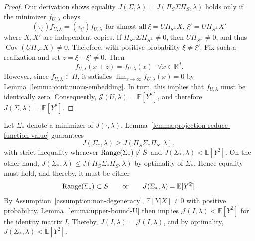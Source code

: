 \documentclass[sn-mathphys-num]{sn-jnl}%
\numberwithin{equation}{section}
\newcommand{\R}{\mathbb{R}}
\newcommand{\E}{\mathbb{E}}
\renewcommand{\P}{\mathbb{P}}
\newtheorem{assumption}{Assumption}[section]
\newcommand{\Range}{{\rm Range}}
\theoremstyle{thmstyleone}%
\theoremstyle{thmstyletwo}%
\theoremstyle{thmstylethree}%
\begin{document}
\begin{proof}
Our derivation shows equality 
$J(\Sigma, \lambda) = J(\Pi_{S} \Sigma \Pi_S, \lambda)$ holds
only if the minimizer $f_{U, \lambda}$ obeys 
\begin{equation*}
(\tau_{\xi}) f_{U, \lambda} = (\tau_{\xi'}) f_{U, \lambda}~~\text{for almost all}~\xi= U\Pi_{S^\perp} X, \, \xi' = U\Pi_{S^\perp}X'
\end{equation*}
where $X, X'$ are independent copies. If $\Pi_{S^\perp}\Sigma\Pi_{S^\perp}\neq 0$, then $U\Pi_{S^\perp}\neq 0$, and thus $\operatorname{Cov}(U\Pi_{S^\perp}X)\neq 0$. Therefore, with positive probability $\xi\neq \xi'$. Fix such a realization and set $z=\xi-\xi'\neq 0$. Then
\begin{equation*}
	f_{U, \lambda}(x + z)  = f_{U, \lambda}(x)~~~\forall x\in \R^d.
\end{equation*}
However, since $f_{U, \lambda} \in H$, it satisfies $\lim_{x \to \infty} f_{U, \lambda}(x) = 0$ 
by Lemma~\ref{lemma:continuous-embedding}. In turn, this implies that $f_{U, \lambda}$ must be identically zero. 
Consequently, $\mathcal{J}(U, \lambda) = \E[Y^2]$, and therefore $J(\Sigma, \lambda) = \E[Y^2]$.
\end{proof} 

%

\vspace{.5em} 

Let $\Sigma_*$ denote a 
minimizer of $J(\cdot, \lambda)$. Lemma~\ref{lemma:projection-reduce-function-value}
guarantees 
\[
J(\Sigma_*,\lambda)\ge J(\Pi_S\Sigma_*\Pi_S,\lambda),
\]
with strict inequality whenever
$\Range(\Sigma_*)\not\subset S$ and
$J(\Sigma_*,\lambda)<\mathbb{E}[Y^2]$. On the other hand, 
$J(\Sigma_*,\lambda) \le J(\Pi_S \Sigma_* \Pi_S,\lambda)$ by optimality of $\Sigma_*$. 
Hence equality must hold, and thereby, it must be either
\[
\Range(\Sigma_*)\subset S
\qquad\text{or}\qquad
J(\Sigma_*,\lambda)=\mathbb{E}[Y^2].
\]
By Assumption~\ref{assumption:non-degeneracy}, $\E[Y|X] \neq 0$ with positive probability. 
Lemma~\ref{lemma:upper-bound-U} then implies $\mathcal{J}(I,\lambda) < \E[Y^2]$ for the identity matrix $I$. Thereby, 
$J(I,\lambda)=\mathcal{J}(I,\lambda)$, and by optimality, $J(\Sigma_*, \lambda) < \E[Y^2]$. 
\end{document}
